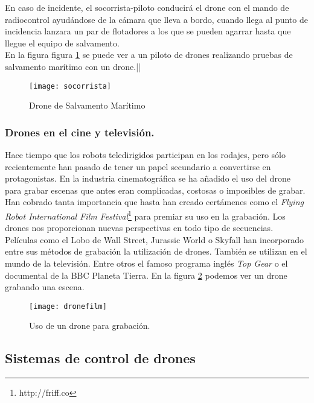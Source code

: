 En caso de incidente, el socorrista-piloto conducirá el drone con el mando de radiocontrol ayudándose de la cámara que lleva a bordo, cuando llega al punto de incidencia lanzara un par de flotadores a los que se pueden agarrar hasta que llegue el equipo de salvamento.\\

En la figura figura \ref{fig:socorrista} se puede ver a un piloto de drones realizando pruebas de salvamento marítimo con un drone.||

 \begin{figure}[h!]
\centering
\texttt{[image: socorrista]}
\caption{Drone de Salvamento Marítimo}
\label{fig:socorrista}
\end{figure}

\subsubsection{Drones en el cine y televisión.}

Hace tiempo que los robots teledirigidos participan en los rodajes, pero sólo recientemente han pasado de tener un papel secundario a convertirse en protagonistas. En la industria cinematográfica se ha añadido el uso del drone para grabar escenas que antes eran complicadas, costosas o imposibles de grabar. Han cobrado tanta importancia que hasta han creado certámenes como el \emph{Flying Robot International Film Festival}\footnote{http://friff.co} para premiar su uso en la grabación. Los drones nos proporcionan nuevas perspectivas en todo tipo de secuencias.\\

Películas como el Lobo de Wall Street, Jurassic World o Skyfall han incorporado entre sus métodos de grabación la utilización de drones. También se utilizan en el mundo de la televisión. Entre otros el famoso programa inglés \emph{Top Gear} o el documental de la BBC Planeta Tierra. En la figura \ref{fig:dronefilm} podemos ver un drone grabando una escena.\\

\begin{figure}[h!]
\centering
\texttt{[image: dronefilm]}
\caption{Uso de un drone para grabación.}
\label{fig:dronefilm}
\end{figure}



\subsection{Sistemas de control de drones}
\label{cap:controldrones}

